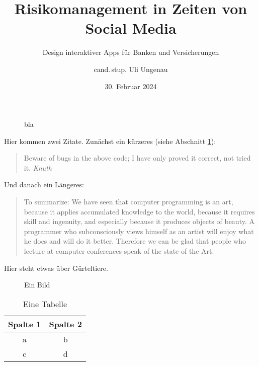 \documentclass{scrreprt}
\begin{document}
	\titlehead{\Large Universität Schlauenheim}
	\subject{Masterarbeit}
	\title{Risikomanagement in Zeiten von Social Media}
	\subtitle{Design interaktiver Apps für Banken und Versicherungen}
	\author{cand.\,stup. Uli Ungenau}
	\date{30. Februar 2024}
	\publishers{Betreut durch Prof.\,Dr.\,rer.\,stup. Naseweis}
	\dedication{Für meine Mama.}

	\maketitle
	
	\begin{abstract}
		\noindent\blindtext
	\end{abstract}
	
	\tableofcontents
	\listoffigures
	\listoftables
	
	
	\blinddocument

\begin{figure}

	\caption{bla	\label{fig:ende}}

\end{figure}
	

	Hier kommen zwei Zitate. Zunächst ein kürzeres (siehe Abschnitt \cref{fig:ende}):
	\begin{quote}
		Beware of bugs in the above code; I have only proved it correct, not tried it. \hfill\textit{Knuth}
	\end{quote}
	Und danach ein Längeres:
	\begin{quotation}
		To summarize: We have seen that computer programming is an art, because it applies accumulated knowledge to the world, because it requires skill and ingenuity, and especially because it produces objects of beauty. A programmer who subconsciously views himself as an artist will enjoy what he does and will do it better. Therefore we can be glad that people who lecture at computer conferences speak of the state of the Art. \cite{knuth74}
	\end{quotation}
	
	Hier steht etwas über Gürteltiere. \cite{autor88}  \blindtext[3]
	
	\begin{figure}
		\centering
		\caption{Ein Bild}
		\label{fig:dasbild}
	\end{figure}
	
	\begin{table}
		\centering
		\begin{tabular}{cc}
			\toprule
			Spalte 1 & Spalte 2\\
			\midrule
			a & b \\
			c & d
		\end{tabular}
		\caption{Eine Tabelle}
		\label{tab:dietabelle}
	\end{table}
	
\end{document}
